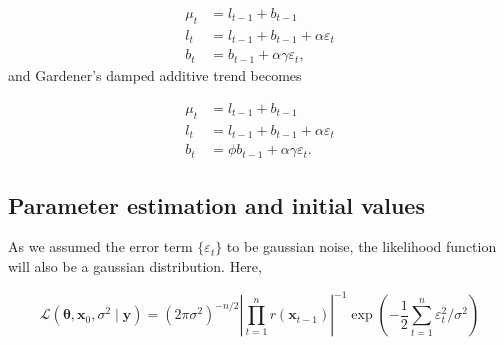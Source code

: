 \begin{equation}
	\begin{array}{rl}
		\mu_{t}&=l_{t-1}+b_{t-1} \\
		l_{t}&=l_{t-1}+b_{t-1}+\alpha \varepsilon_{t} \\
		b_{t}&=b_{t-1}+\alpha \gamma \varepsilon_{t},
	\end{array}
\end{equation}
%
and Gardener's damped additive trend becomes

\begin{equation}
	\begin{array}{rl}
		\mu_{t}&=l_{t-1}+b_{t-1} \\
		l_{t}&=l_{t-1}+b_{t-1}+\alpha \varepsilon_{t} \\
		b_{t}&=\phi b_{t-1}+\alpha \gamma \varepsilon_{t}.
	\end{array}
\end{equation}
%

\subsection{Parameter estimation and initial values}

As we assumed the error term $\{\varepsilon_t\}$ to be gaussian noise, the likelihood function will also be a gaussian distribution. Here, 

\begin{equation}
	\mathcal{L}\left(\boldsymbol{\theta}, \boldsymbol{x}_{0}, \sigma^{2} \mid \boldsymbol{y}\right)=\left(2 \pi \sigma^{2}\right)^{-n / 2}\left|\prod_{t=1}^{n} r\left(\boldsymbol{x}_{t-1}\right)\right|^{-1} \exp \left(-\frac{1}{2} \sum_{t=1}^{n} \varepsilon_{t}^{2} / \sigma^{2}\right)
\end{equation}
























